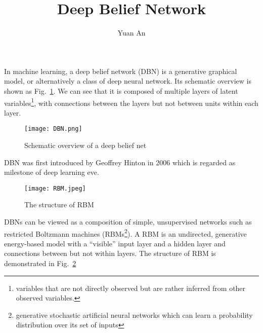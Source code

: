 \documentclass[a4paper,12pt,twocolumn]{article}
\title{Deep Belief Network}
\author{Yuan An}
\begin{document}
\maketitle

In machine learning, a deep belief network (DBN) is a generative graphical model\cite{DBNwikipedia}, or alternatively a class of deep neural network. Its schematic overview is shown as Fig.~\ref{DBN}. We can see that it is composed of multiple layers of latent variables\footnote{variables that are not directly observed but are rather inferred from other observed variables.}, with connections between the layers but not between units within each layer.
\begin{figure}[h]
	\centering
	\texttt{[image: DBN.png]}
	\caption{Schematic overview of a deep belief net}\label{DBN}
\end{figure}
\par
DBN was first introduced by Geoffrey Hinton in 2006 \cite{DBN} which is regarded as milestone of deep learning eve. 
\begin{figure}[h]
	\centering
	\texttt{[image: RBM.jpeg]}
	\caption{The structure of RBM}\label{RBM}
\end{figure}
\par
DBNs can be viewed as a composition of simple, unsupervised networks such as restricted Boltzmann machines (RBMs\footnote{ generative stochastic artificial neural networks which can learn a probability distribution over its set of inputs}). A RBM is an undirected, generative energy-based model with a ``visible'' input layer and a hidden layer and connections between but not within layers. The structure of RBM is demonstrated in Fig.~\ref{RBM} 


\end{document}
